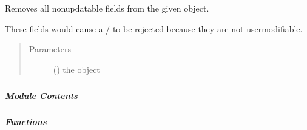 \documentclass[letterpaper,10pt,english]{sphinxmanual}
\begin{document}
\begin{fulllineitems}
\label{\detokenize{autoapi/pine/client/models/index:pine.client.models.remove_nonupdatable_fields}}
\sphinxAtStartPar
Removes all non\sphinxhyphen{}updatable fields from the given object.

\sphinxAtStartPar
These fields would cause a / to be rejected because they are not user\sphinxhyphen{}modifiable.
\begin{quote}\begin{description}
\item[{Parameters}] \leavevmode
\sphinxAtStartPar
{} () \textendash{} the object

\end{description}\end{quote}

\end{fulllineitems}



\subparagraph{}
\label{\detokenize{autoapi/pine/client/password/index:module-pine.client.password}}\label{\detokenize{autoapi/pine/client/password/index:pine-client-password}}\label{\detokenize{autoapi/pine/client/password/index::doc}}

\subparagraph{Module Contents}
\label{\detokenize{autoapi/pine/client/password/index:module-contents}}

\subparagraph{Functions}
\label{\detokenize{autoapi/pine/client/password/index:functions}}
\end{document}
